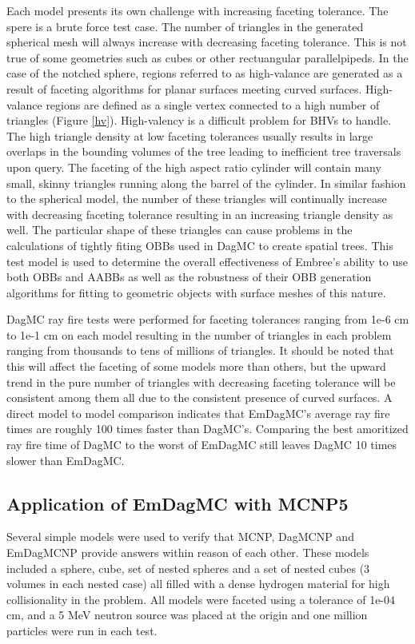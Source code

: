 \documentclass{anstrans}
\begin{document}
Each model presents its own challenge with increasing faceting tolerance. The spere is a brute force test case. The number of triangles in the generated spherical mesh will always increase with decreasing faceting tolerance. This is not true of some geometries such as cubes or other rectuangular parallelpipeds. In the case of the notched sphere, regions referred to as high-valance are generated as a result of faceting algorithms for planar surfaces meeting curved surfaces. High-valance regions are defined as a single vertex connected to a high number of triangles (Figure \ref{hv}). High-valency is a difficult problem for BHVs to handle. The high triangle density at low faceting tolerances usually results in large overlaps in the bounding volumes of the tree leading to inefficient tree traversals upon query. The faceting of the high aspect ratio cylinder will contain many small, skinny triangles running along the barrel of the cylinder. In similar fashion to the spherical model, the number of these triangles will continually increase with decreasing faceting tolerance resulting in an increasing triangle density as well. The particular shape of these triangles can cause problems in the calculations of tightly fiting OBBs used in DagMC to create spatial trees. This test model is used to determine the overall effectiveness of Embree's ability to use both OBBs and AABBs as well as the robustness of their OBB generation algorithms for fitting to geometric objects with surface meshes of this nature.

DagMC ray fire tests were performed for faceting tolerances ranging from 1e-6 cm to 1e-1 cm on each model resulting in the number of triangles in each problem ranging from thousands to tens of millions of triangles. It should be noted that this will affect the faceting of some models more than others, but the upward trend in the pure number of triangles with decreasing faceting tolerance will be consistent among them all due to the consistent presence of curved surfaces. A direct model to model comparison indicates that EmDagMC's average ray fire times are roughly 100 times faster than DagMC's. Comparing the best amoritized ray fire time of DagMC to the worst of EmDagMC  still leaves DagMC 10 times slower than EmDagMC.

\subsection{Application of EmDagMC with MCNP5}

Several simple models were used to verify that MCNP, DagMCNP and EmDagMCNP provide answers within reason of each other. These models included a sphere, cube, set of nested spheres and a set of nested cubes (3 volumes in each nested case) all filled with a dense hydrogen material for high collisionality in the problem. All models were faceted using a tolerance of 1e-04 cm, and a 5 MeV neutron source was placed at the origin and one million particles were run in each test.
\end{document}
